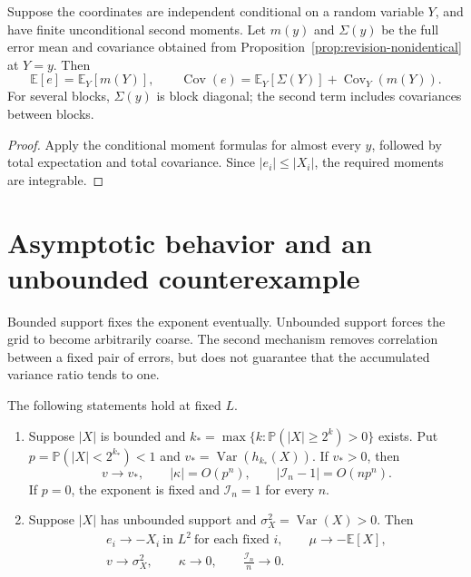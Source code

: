 \begin{corollary}\label{cor:conditional-mixture}
Suppose the coordinates are independent conditional on a random variable
$Y$, and have finite unconditional second moments. Let $m(y)$ and $\Sigma(y)$
be the full error mean and covariance obtained from
Proposition~\ref{prop:revision-nonidentical} at $Y=y$. Then
\begin{equation}\label{eq:conditional-mixture}
 \mathbb E[e]=\mathbb E_Y[m(Y)],\qquad
 \operatorname{Cov}(e)=\mathbb E_Y[\Sigma(Y)]
                         +\operatorname{Cov}_Y(m(Y)).
\end{equation}
For several blocks, $\Sigma(y)$ is block diagonal; the second term includes
covariances between blocks.
\end{corollary}
\begin{proof}
Apply the conditional moment formulas for almost every $y$, followed by
total expectation and total covariance. Since $|e_i|\le|X_i|$,
the required moments are integrable.
\end{proof}

\section{Asymptotic behavior and an unbounded counterexample}\label{sec:revision-asymptotics}

Bounded support fixes the exponent eventually. Unbounded support forces
the grid to become arbitrarily coarse. The second mechanism removes
correlation between a fixed pair of errors, but does not guarantee that
the accumulated variance ratio tends to one.

\begin{proposition}
\label{prop:revision-support}
The following statements hold at fixed $L$.
\begin{enumerate}
\item Suppose $|X|$ is bounded and
$k_* =\max\{k:\mathbb P(|X|\ge2^k)>0\}$ exists. Put
$p=\mathbb P(|X|<2^{k_*})<1$ and
$v_*=\operatorname{Var}(h_{k_*}(X))$. If $v_*>0$, then
\begin{equation}\label{eq:revision-bounded}
 v\longrightarrow v_*,\qquad |\kappa|=O(p^n),\qquad
 |\mathcal I_n-1|=O(np^n).
\end{equation}
If $p=0$, the exponent is fixed and $\mathcal I_n=1$ for every $n$.
\item Suppose $|X|$ has unbounded support and
$\sigma_X^2=\operatorname{Var}(X)>0$. Then
\begin{equation}\label{eq:revision-unbounded}
 \begin{gathered}
 e_i\longrightarrow-X_i\ \text{in }L^2\ \text{for each fixed }i,
 \qquad \mu\longrightarrow-\mathbb E[X],\\
 v\longrightarrow\sigma_X^2,\qquad
 \kappa\longrightarrow0,\qquad \frac{\mathcal I_n}{n}\longrightarrow0.
 \end{gathered}
\end{equation}
\end{enumerate}
\end{proposition}

